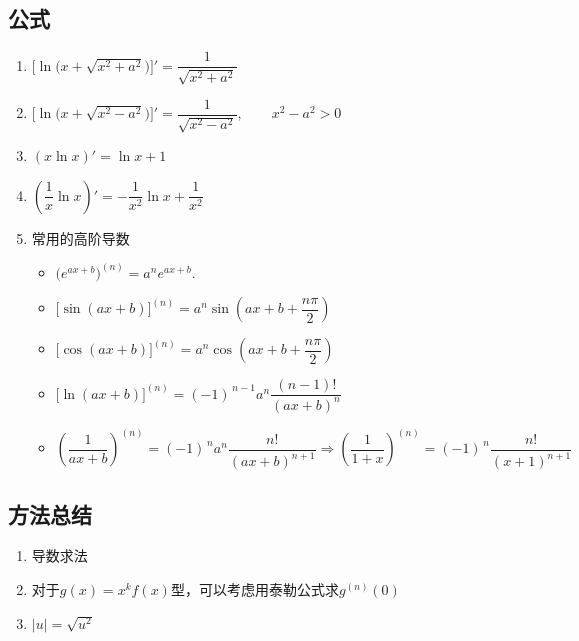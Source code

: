 \documentclass[../book.tex]{subfiles}
\begin{document}
    \subsection{公式}

    \begin{enumerate}
        \item $\bigl[\ln\bigl(x+\sqrt{x^2+a^2}\bigr)\bigr]' = \dfrac{1}{\sqrt{x^2+a^2}}$
        \item $\bigl[\ln\bigl(x+\sqrt{x^2-a^2}\bigr)\bigr]' = \dfrac{1}{\sqrt{x^2-a^2}}, \qquad x^2-a^2>0$
        \item $(x\ln x)' = \ln x + 1$
        \item $(\dfrac{1}{x} \ln x)' = -\dfrac{1}{x^2} \ln x + \dfrac{1}{x^2}$
        \item 常用的高阶导数
        \begin{itemize}
            \item $\bigl(e^{ax+b}\bigr)^{(n)} = a^{n} e^{ax+b}.$
            \item $\bigl[\sin(ax+b)\bigr]^{(n)} = a^{n} \sin\!\left(ax+b+\dfrac{n\pi}{2}\right)$
            \item $\bigl[\cos(ax+b)\bigr]^{(n)} = a^{n} \cos\!\left(ax+b+\dfrac{n\pi}{2}\right)$
            \item $\bigl[\ln(ax+b)\bigr]^{(n)} = (-1)^{\,n-1}a^{n}\dfrac{(n-1)!}{(ax+b)^{n}}$
            \item $\left(\dfrac{1}{ax+b}\right)^{(n)} = (-1)^{\,n}a^{n}\dfrac{n!}{(ax+b)^{n+1}} \Rightarrow (\dfrac{1}{1 + x})^{(n)} = (-1)^{\,n}\dfrac{n!}{(x+1)^{n+1}}$
        \end{itemize}
    \end{enumerate}

    \subsection{方法总结}

    \begin{enumerate}
        \item 导数求法
        \item 对于$g(x) = x^k f(x)$型，可以考虑用泰勒公式求$g^{(n)}(0)$
        \item $|u| = \sqrt {u^2}$
    \end{enumerate}
\end{document}
